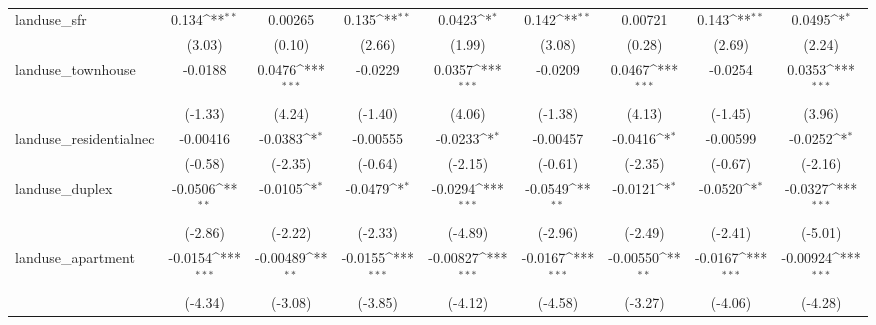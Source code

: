\begin{table}[htbp]\centering
\def\sym#1{\ifmmode^{#1}\else\(^{#1}\)\fi}
\caption{ \label{tab1}}
\begin{tabular}{l*{8}{c}}
\toprule
\midrule
landuse\_sfr         &       0.134\sym{**} &     0.00265         &       0.135\sym{**} &      0.0423\sym{*}  &       0.142\sym{**} &     0.00721         &       0.143\sym{**} &      0.0495\sym{*}  \\
                    &      (3.03)         &      (0.10)         &      (2.66)         &      (1.99)         &      (3.08)         &      (0.28)         &      (2.69)         &      (2.24)         \\
\addlinespace
landuse\_townhouse   &     -0.0188         &      0.0476\sym{***}&     -0.0229         &      0.0357\sym{***}&     -0.0209         &      0.0467\sym{***}&     -0.0254         &      0.0353\sym{***}\\
                    &     (-1.33)         &      (4.24)         &     (-1.40)         &      (4.06)         &     (-1.38)         &      (4.13)         &     (-1.45)         &      (3.96)         \\
\addlinespace
landuse\_residentialnec&    -0.00416         &     -0.0383\sym{*}  &    -0.00555         &     -0.0233\sym{*}  &    -0.00457         &     -0.0416\sym{*}  &    -0.00599         &     -0.0252\sym{*}  \\
                    &     (-0.58)         &     (-2.35)         &     (-0.64)         &     (-2.15)         &     (-0.61)         &     (-2.35)         &     (-0.67)         &     (-2.16)         \\
\addlinespace
landuse\_duplex      &     -0.0506\sym{**} &     -0.0105\sym{*}  &     -0.0479\sym{*}  &     -0.0294\sym{***}&     -0.0549\sym{**} &     -0.0121\sym{*}  &     -0.0520\sym{*}  &     -0.0327\sym{***}\\
                    &     (-2.86)         &     (-2.22)         &     (-2.33)         &     (-4.89)         &     (-2.96)         &     (-2.49)         &     (-2.41)         &     (-5.01)         \\
\addlinespace
landuse\_apartment   &     -0.0154\sym{***}&    -0.00489\sym{**} &     -0.0155\sym{***}&    -0.00827\sym{***}&     -0.0167\sym{***}&    -0.00550\sym{**} &     -0.0167\sym{***}&    -0.00924\sym{***}\\
                    &     (-4.34)         &     (-3.08)         &     (-3.85)         &     (-4.12)         &     (-4.58)         &     (-3.27)         &     (-4.06)         &     (-4.28)         \\

\end{tabular}
\end{table}
